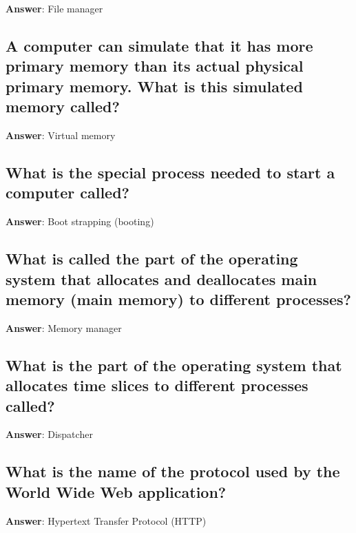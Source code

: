\documentclass[a4paper,11pt,oneside]{article}
\begin{document}
\begin{sloppypar}
\textbf{Answer}: File manager



\subsection{A computer can simulate that it has more primary memory than its actual physical primary memory. What is this simulated memory called?}

\label{q:14:sa:en:True}

\textbf{Answer}: Virtual memory



\subsection{What is the special process needed to start a computer called?}

\label{q:15:sa:en:True}

\textbf{Answer}: Boot strapping (booting)



\subsection{What is called the part of the operating system that allocates and deallocates main memory (main memory) to different processes?}

\label{q:16:sa:en:True}

\textbf{Answer}: Memory manager



\subsection{What is the part of the operating system that allocates time slices to different processes called?}

\label{q:17:sa:en:True}

\textbf{Answer}: Dispatcher



\subsection{What is the name of the protocol used by the World Wide Web application?}

\label{q:18:sa:en:True}

\textbf{Answer}: Hypertext Transfer Protocol (HTTP)




\end{sloppypar}
\end{document}
